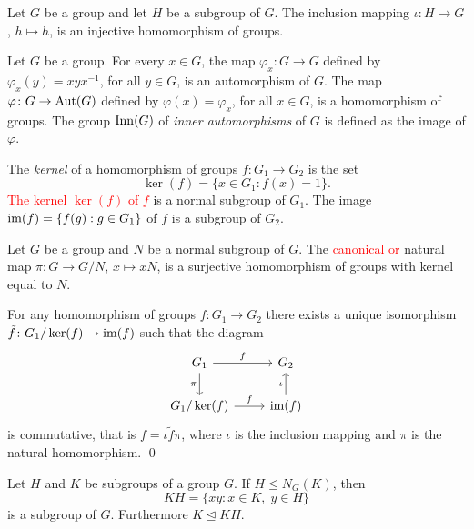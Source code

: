 \begin{example} 
    Let $G$ be a group and let $H$ be a subgroup of $G$. 
    The inclusion mapping $\iota\colon H\rightarrow G$, $h\mapsto h$, is an injective homomorphism of groups. 
\end{example}

\begin{example}
	Let $G$ be a group. For every $x\in G$, the map $\varphi_x\colon G\rightarrow G$ defined by $\varphi_x(y)=xyx^{-1}$, for all $y\in G$, is an automorphism of $G$. The map $\varphi\colon G\rightarrow \operatorname{Aut}(G)$ defined by $\varphi(x)=\varphi_x$, for all $x\in G$, is a homomorphism of groups. 
    The group $\mathrm{Inn}(G)$ of {\em inner automorphisms} of $G$ is defined as the 
	image of $\varphi$.
\end{example}

The {\em kernel} of a homomorphism of groups $f\colon G_1\rightarrow G_2$ is the set
\[
\ker (f)=\{ x\in G_1: f(x)=1\}.
\]
\textcolor{red}{The kernel $\ker(f)$ of $f$} is a normal 
subgroup of $G_1$. The image $\operatorname{im}(f)=\{f(g):g\in G_1\}$ 
of $f$ is a subgroup of $G_2$.

\begin{example}
Let $G$ be a group and $N$ be a normal subgroup of $G$. 
The \textcolor{red}{canonical or} natural map $\pi\colon G\rightarrow G/N$, $x\mapsto xN$, is a surjective homomorphism of groups with kernel equal to $N$.
\end{example}

\begin{theorem}
	For any homomorphism of groups $f\colon G_1\rightarrow G_2$ there exists a unique isomorphism $\tilde f\colon G_1/\ker(f)\rightarrow\operatorname{im}(f)$ such that the diagram
	\[\begin{tikzcd}
		{G_1} & {G_2} \\
		{G_1/\ker(f)} & {\im(f)}
		\arrow["f", from=1-1, to=1-2]
		\arrow["{\pi}"', from=1-1, to=2-1]
		\arrow["{\iota}", from=2-2, to=1-2]
		\arrow["{\tilde f}", from=2-1, to=2-2]
	\end{tikzcd}
	\]
	is commutative, that is $f=\iota\tilde f\pi$, 
	where $\iota$ is the inclusion mapping and $\pi$ is the natural homomorphism. \qed	
\end{theorem} 
 

Let $H$ and $K$ be subgroups of a group $G$. If $H\leq N_G(K)$, 
then \[
KH=\{xy: x\in K,\; y\in H\}
\]
is a subgroup of $G$. Furthermore $K\unlhd KH$.

